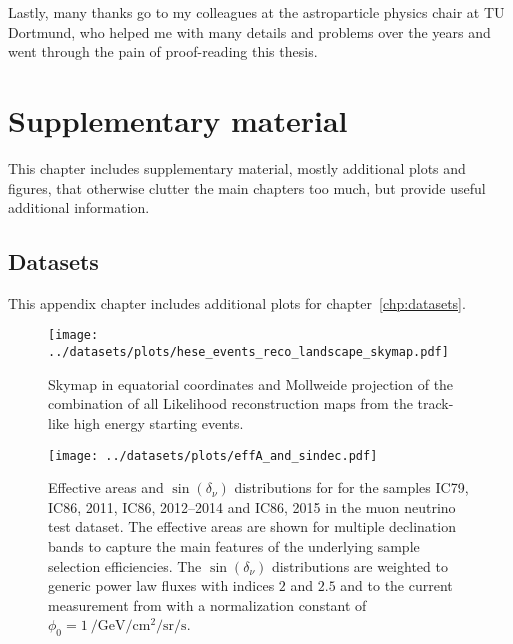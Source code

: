 Lastly, many thanks go to my colleagues at the astroparticle physics chair at TU Dortmund, who helped me with many details and problems over the years and went through the pain of proof-reading this thesis.

\chapter{Supplementary material}
This chapter includes supplementary material, mostly additional plots and figures, that otherwise clutter the main chapters too much, but provide useful additional information.


\section{Datasets}
This appendix chapter includes additional plots for chapter~\ref{chp:datasets}.

\begin{figure}[H]
  \centering
  \texttt{[image: ../datasets/plots/hese\_events\_reco\_landscape\_skymap.pdf]}
  \caption[Combined Likelihood skymap of the 22 HESEs]{
    Skymap in equatorial coordinates and Mollweide projection of the combination of all Likelihood reconstruction maps from the track-like high energy starting events.
  }
  \label{fig:hese_events_reco_landscape_skymap}
\end{figure}

\begin{figure}[H]
  \centering
  \texttt{[image: ../datasets/plots/effA\_and\_sindec.pdf]}
  \caption[Effective areas and $\sin(\delta_\nu)$ distributions]{
    Effective areas and $\sin(\delta_\nu)$ distributions for for the samples IC79, IC86, 2011, IC86, 2012--2014 and IC86, 2015 in the muon neutrino test dataset.
    The effective areas are shown for multiple declination bands to capture the main features of the underlying sample selection efficiencies.
    The $\sin(\delta_\nu)$ distributions are weighted to generic power law fluxes with indices $2$ and $2.5$ and to the current measurement from \cite{Haack:2017dxi} with a normalization constant of $\phi_0 = \SI[per-mode=reciprocal]{1}{\per\GeV\per\cm\squared\per\steradian\per\second}$.
    }
  \label{fig:effA_and_sindec}
\end{figure}


